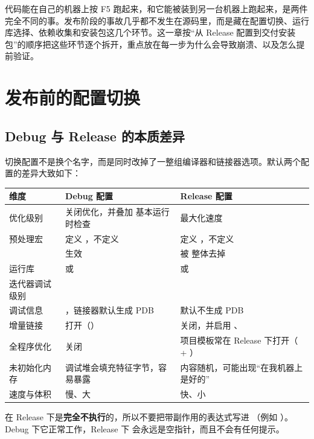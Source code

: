 代码能在自己的机器上按 F5 跑起来，和它能被装到另一台机器上跑起来，是两件完全不同的事。发布阶段的事故几乎都不发生在源码里，而是藏在配置切换、运行库选择、依赖收集和安装包这几个环节。这一章按“从 Release 配置到交付安装包”的顺序把这些环节逐个拆开，重点放在每一步为什么会导致崩溃、以及怎么提前验证。
\section{发布前的配置切换}
\subsection{Debug 与 Release 的本质差异}
切换配置不是换个名字，而是同时改掉了一整组编译器和链接器选项。默认两个配置的差异大致如下：

\begin{longtable}{L{2.8cm}L{5.8cm}L{5.9cm}}
\toprule
\textbf{维度} & \textbf{Debug 配置} & \textbf{Release 配置} \\
\midrule
\endhead
\bottomrule
\endlastfoot
优化级别 &  关闭优化，并叠加  基本运行时检查 &  最大化速度 \\
预处理宏 & 定义 ，不定义  & 定义 ，不定义  \\
 & 生效 & 被  整体去掉 \\
运行库 &  或  &  或  \\
迭代器调试级别 &  &  \\
调试信息 & ，链接器默认生成 PDB & 默认不生成 PDB \\
增量链接 & 打开（） & 关闭，并启用 、 \\
全程序优化 & 关闭 & 项目模板常在 Release 下打开（ + ） \\
未初始化内存 & 调试堆会填充特征字节，容易暴露 & 内容随机，可能出现“在我机器上是好的” \\
速度与体积 & 慢、大 & 快、小 \\
\end{longtable}

\begin{warnbox}[注意]
 在 Release 下是\textbf{完全不执行}的，所以不要把带副作用的表达式写进 （例如 ）。Debug 下它正常工作，Release 下  会永远是空指针，而且不会有任何提示。
\end{warnbox}

